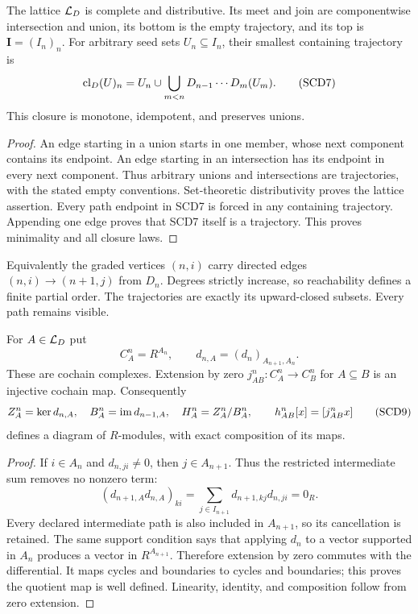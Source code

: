 \begin{theorem}
The lattice \(\mathcal L_D\) is complete and distributive. Its meet and join
are componentwise intersection and union, its bottom is the empty
trajectory, and its top is \(\mathbf I=(I_n)_n\).
For arbitrary seed sets \(U_n\subseteq I_n\), their smallest containing
trajectory is
\[
 \operatorname{cl}_D(U)_n=U_n\cup
 \bigcup_{m<n}D_{n-1}\cdots D_m(U_m).
 \tag{SCD7}
\]
This closure is monotone, idempotent, and preserves unions.
\end{theorem}
\begin{proof}
An edge starting in a union starts in one member, whose next component
contains its endpoint. An edge starting in an intersection has its
endpoint in every next component. Thus arbitrary unions and intersections
are trajectories, with the stated empty conventions. Set-theoretic
distributivity proves the lattice assertion. Every path endpoint in SCD7
is forced in any containing trajectory. Appending one edge proves that
SCD7 itself is a trajectory. This proves minimality and all closure laws.
\end{proof}

Equivalently the graded vertices \((n,i)\) carry directed edges
\((n,i)\to(n+1,j)\) from \(D_n\). Degrees strictly increase, so
reachability defines a finite partial order. The trajectories are
exactly its upward-closed subsets. Every path remains visible.

\begin{theorem}
For \(A\in\mathcal L_D\) put
\[
 C_A^n=R^{A_n},\qquad d_{n,A}=(d_n)_{A_{n+1},A_n}.
 \tag{SCD8}
\]
These are cochain complexes. Extension by zero \(j_{AB}^n:C_A^n\to C_B^n\)
for \(A\subseteq B\) is an injective cochain map. Consequently
\[
 Z_A^n=\ker d_{n,A},\quad B_A^n=\operatorname{im} d_{n-1,A},\quad
 H_A^n=Z_A^n/B_A^n,\qquad
 h_{AB}^n[x]=[j_{AB}^nx]
 \tag{SCD9}
\]
defines a diagram of \(R\)-modules, with exact composition of its maps.
\end{theorem}
\begin{proof}
If \(i\in A_n\) and \(d_{n,ji}\ne0\), then \(j\in A_{n+1}\).
Thus the restricted intermediate sum removes no nonzero term:
\[
 (d_{n+1,A}d_{n,A})_{ki}
 =\sum_{j\in I_{n+1}}d_{n+1,kj}d_{n,ji}=0_R.
\]
Every declared intermediate path is also included in \(A_{n+1}\),
so its cancellation is retained. The same support condition says
that applying \(d_n\) to a vector supported in \(A_n\) produces
a vector in \(R^{A_{n+1}}\). Therefore extension by zero commutes
with the differential. It maps cycles and boundaries to cycles
and boundaries; this proves the quotient map is well defined.
Linearity, identity, and composition follow from zero extension.
\end{proof}

